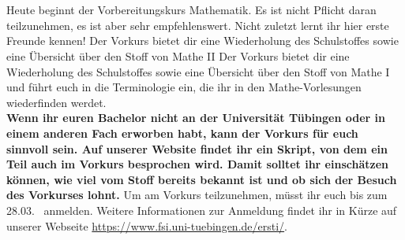 \begin{description}

%
%
\ifml 
	\item~ %
\else 
	\item[Montag, 1. Oktober \YEAR, 10 Uhr, Sand 6, Raum F119]\ \\
	Heute beginnt der Vorbereitungskurs Mathematik. Es ist nicht Pflicht daran teilzunehmen,
	es ist aber sehr empfehlenswert. Nicht zuletzt lernt ihr hier erste Freunde kennen!
	\ifsommersemester
	Der Vorkurs bietet dir eine Wiederholung des Schulstoffes sowie eine Übersicht über den Stoff von Mathe II
	\fi
	\ifwintersemester
	Der Vorkurs bietet dir eine Wiederholung des Schulstoffes sowie eine Übersicht über den Stoff von Mathe I
	\fi
	und führt euch in die Terminologie ein, die ihr in den Mathe-Vorlesungen wiederfinden werdet.
	\ifmaster
	\\
	\textbf{Wenn ihr euren Bachelor nicht an der Universität Tübingen oder in einem anderen Fach erworben habt, kann der Vorkurs für euch sinnvoll sein. Auf unserer Website findet ihr ein Skript, von dem ein Teil auch im Vorkurs besprochen wird. Damit solltet ihr einschätzen können, wie viel vom Stoff bereits bekannt ist und ob sich der Besuch des Vorkurses lohnt.}
	\fi
	Um am Vorkurs teilzunehmen, müsst ihr euch bis zum 28.03. \YEAR~anmelden. Weitere Informationen zur Anmeldung findet ihr in Kürze auf unserer Webseite \url{https://www.fsi.uni-tuebingen.de/ersti/}.


\end{description}
